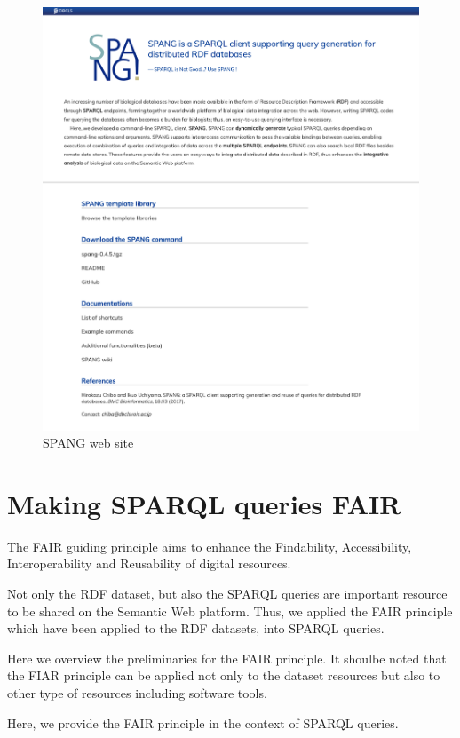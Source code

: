 \documentclass[runningheads]{llncs}
\begin{document}
\begin{figure}
\center
\includegraphics[width=1.0\textwidth]{spang_top.png}
\caption{SPANG web site}
\label{fig:spang_top}
\end{figure}


\section{Making SPARQL queries FAIR}

The FAIR guiding principle aims to enhance the Findability, Accessibility, Interoperability and Reusability of digital resources.

Not only the RDF dataset, but also the SPARQL queries are important resource to be shared on the Semantic Web platform. Thus, we applied the FAIR principle which have been applied to the RDF datasets, into SPARQL queries.

Here we overview the preliminaries for the FAIR principle.
It shoulbe noted that the FIAR principle can be applied not only to the dataset resources but also to other type of resources including software tools.

Here, we provide the FAIR principle in the context of SPARQL queries.
\end{document}
